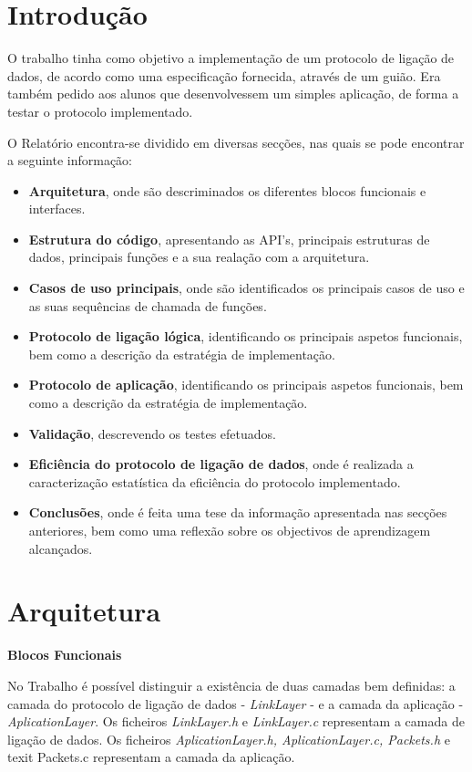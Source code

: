 \documentclass[a4paper, 11pt]{article}
\begin{document}
\section{Introdução}

O trabalho tinha como objetivo a implementação de um protocolo de ligação de dados, de acordo como uma especificação fornecida, através de um guião. Era também pedido aos alunos que desenvolvessem um simples aplicação, de forma a testar o protocolo implementado.

O Relatório encontra-se dividido em diversas secções, nas quais se pode encontrar a seguinte informação:
\begin{itemize}
	\item \textbf{Arquitetura}, onde são descriminados os diferentes blocos funcionais e interfaces.
	\item \textbf{Estrutura do código}, apresentando as API's, principais estruturas de dados, principais funções e a sua realação com a arquitetura.
	\item \textbf{Casos de uso principais}, onde são identificados os principais casos de uso e as suas sequências de chamada de funções.
	\item \textbf{Protocolo de ligação lógica}, identificando os principais aspetos funcionais, bem como a descrição da estratégia de implementação.
	\item \textbf{Protocolo de aplicação},  identificando os principais aspetos funcionais, bem como a descrição da estratégia de implementação.
	\item \textbf{Validação}, descrevendo os testes efetuados.
	\item \textbf{Eficiência do protocolo de ligação de dados}, onde é realizada a caracterização estatística da eficiência do protocolo implementado.
	\item \textbf{Conclusões}, onde é feita uma tese da informação apresentada nas secções anteriores, bem como uma reflexão sobre os objectivos de aprendizagem alcançados.
\end{itemize}

\section{Arquitetura}

\large\textbf{Blocos Funcionais}\\
\normalsize 

No Trabalho é possível distinguir a existência de duas camadas bem definidas:  a camada do protocolo de ligação de dados - \textit{LinkLayer} - e a camada da aplicação - \textit{AplicationLayer}.
Os ficheiros \textit{LinkLayer.h} e  \textit{LinkLayer.c} representam a camada de ligação de dados. Os ficheiros \textit{AplicationLayer.h, AplicationLayer.c, Packets.h} e \\texit{ Packets.c} representam a camada da aplicação.
\end{document}
